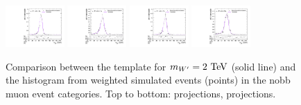 \begin{figure}[htpb]
  \includegraphics[width=0.2\textwidth]{fig/2Dfit/templateVsReco_WprToWZ2000_r0_MJ_mu_HP_nobb_LDy.pdf}
  \includegraphics[width=0.2\textwidth]{fig/2Dfit/templateVsReco_WprToWZ2000_r0_MJ_mu_LP_nobb_LDy.pdf}
  \includegraphics[width=0.2\textwidth]{fig/2Dfit/templateVsReco_WprToWZ2000_r0_MJ_mu_HP_nobb_HDy.pdf}
  \includegraphics[width=0.2\textwidth]{fig/2Dfit/templateVsReco_WprToWZ2000_r0_MJ_mu_LP_nobb_HDy.pdf}\\
  \caption{
    Comparison between the \DY\WprtoWZ template for $m_{\Wpr}=2\unit{TeV}$ (solid line) and the histogram from weighted simulated events (points) in the nobb muon event categories.
    Top to bottom: \MVV projections, \MJ projections.
  }
  \label{fig:1dtemplateVsReco_WprToWZ2000_Run2}
\end{figure}

